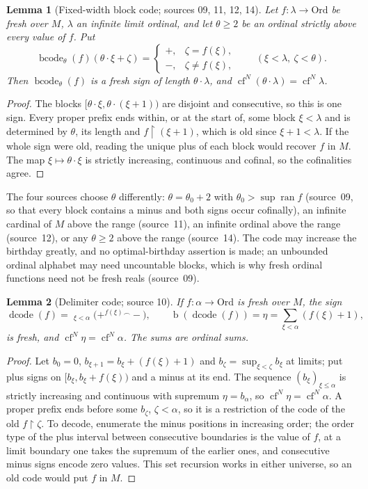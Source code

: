 \documentclass[11pt,letterpaper]{article}
\numberwithin{equation}{section}
\newtheorem{lemma}[lemma]{Lemma}
\theoremstyle{definition}
\theoremstyle{remark}
\newcommand{\Ord}{\mathrm{Ord}}
\newcommand{\bd}{\operatorname{b}}
\newcommand{\cf}{\operatorname{cf}}
\newcommand{\ran}{\operatorname{ran}}
\newcommand{\res}{\mathbin{\upharpoonright}}
\newcommand{\cat}{\mathbin{{}^{\frown}}}
\newcommand{\dcode}{\operatorname{dcode}}
\newcommand{\bcode}{\operatorname{bcode}}
\begin{document}
\begin{lemma}[Fixed-width block code; sources 09, 11, 12, 14]\label{univ:gs:lem:bcode}
Let $f:\lambda\to\Ord$ be fresh over $M$, $\lambda$ an infinite limit ordinal, and
let $\theta\ge2$ be an ordinal strictly above every value of $f$. Put
\[
 \bcode_\theta(f)(\theta\cdot\xi+\zeta)=
 \begin{cases}+,&\zeta=f(\xi),\\ -,&\zeta\ne f(\xi),\end{cases}
 \qquad(\xi<\lambda,\ \zeta<\theta).
\]
Then $\bcode_\theta(f)$ is a fresh sign of length $\theta\cdot\lambda$, and
$\cf^N(\theta\cdot\lambda)=\cf^N\lambda$.
\end{lemma}
\begin{proof}
The blocks $[\theta\cdot\xi,\theta\cdot(\xi+1))$ are disjoint and consecutive, so
this is one sign. Every proper prefix ends within, or at the start of, some block
$\xi<\lambda$ and is determined by $\theta$, its length and $f\res(\xi+1)$, which
is old since $\xi+1<\lambda$. If the whole sign were old, reading the unique plus
of each block would recover $f$ in $M$. The map $\xi\mapsto\theta\cdot\xi$ is
strictly increasing, continuous and cofinal, so the cofinalities agree.
\end{proof}

The four sources choose $\theta$ differently: $\theta=\theta_0+2$ with
$\theta_0>\sup\ran f$ (source~09, so that every block contains a minus and both signs
occur cofinally), an infinite cardinal of $M$ above the range (source~11), an
infinite ordinal above the range (source~12), or any $\theta\ge2$ above the range
(source~14). The code may increase the birthday greatly, and no optimal-birthday
assertion is made; an unbounded ordinal alphabet may need uncountable blocks,
which is why fresh ordinal functions need not be fresh reals (source~09).

\begin{lemma}[Delimiter code; source 10]\label{univ:gs:lem:dcode}
If $f:\alpha\to\Ord$ is fresh over $M$, the sign
\[
 \dcode(f)=\mathop{\cat}_{\xi<\alpha}\bigl(+^{f(\xi)}\cat-\bigr),
 \qquad \bd(\dcode(f))=\eta=\sum_{\xi<\alpha}(f(\xi)+1),
\]
is fresh, and $\cf^N\eta=\cf^N\alpha$. The sums are ordinal sums.
\end{lemma}
\begin{proof}
Let $b_0=0$, $b_{\xi+1}=b_\xi+(f(\xi)+1)$ and $b_\zeta=\sup_{\xi<\zeta}b_\xi$ at
limits; put plus signs on $[b_\xi,b_\xi+f(\xi))$ and a minus at its end. The
sequence $(b_\xi)_{\xi\le\alpha}$ is strictly increasing and continuous with
supremum $\eta=b_\alpha$, so $\cf^N\eta=\cf^N\alpha$. A proper prefix ends before
some $b_\zeta$, $\zeta<\alpha$, so it is a restriction of the code of the old
$f\res\zeta$. To decode, enumerate the minus positions in increasing order; the
order type of the plus interval between consecutive boundaries is the value of
$f$, at a limit boundary one takes the supremum of the earlier ones, and
consecutive minus signs encode zero values. This set recursion works in either
universe, so an old code would put $f$ in $M$.
\end{proof}
\end{document}
